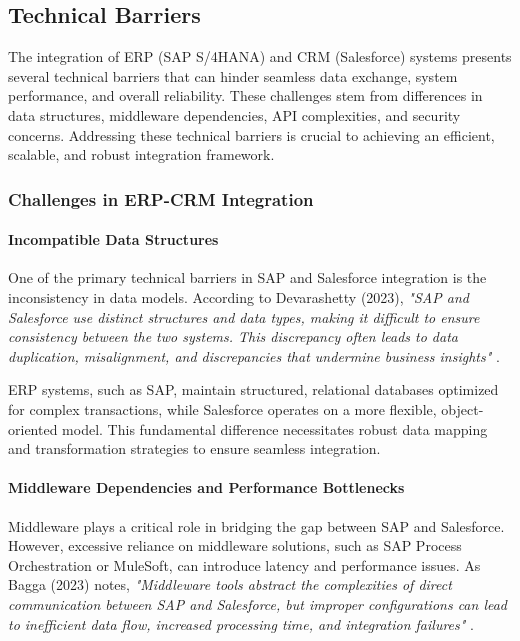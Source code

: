 \subsection{Technical Barriers}

The integration of ERP (SAP S/4HANA) and CRM (Salesforce) systems presents several technical barriers that can hinder seamless data exchange, system performance, and overall reliability. These challenges stem from differences in data structures, middleware dependencies, API complexities, and security concerns. Addressing these technical barriers is crucial to achieving an efficient, scalable, and robust integration framework.

\subsubsection{Challenges in ERP-CRM Integration}

\paragraph{Incompatible Data Structures} One of the primary technical barriers in SAP and Salesforce integration is the inconsistency in data models. According to Devarashetty (2023), \textit{"SAP and Salesforce use distinct structures and data types, making it difficult to ensure consistency between the two systems. This discrepancy often leads to data duplication, misalignment, and discrepancies that undermine business insights"} \cite{devarashetty2023}.

ERP systems, such as SAP, maintain structured, relational databases optimized for complex transactions, while Salesforce operates on a more flexible, object-oriented model. This fundamental difference necessitates robust data mapping and transformation strategies to ensure seamless integration.

\paragraph{Middleware Dependencies and Performance Bottlenecks} Middleware plays a critical role in bridging the gap between SAP and Salesforce. However, excessive reliance on middleware solutions, such as SAP Process Orchestration or MuleSoft, can introduce latency and performance issues. As Bagga (2023) notes, \textit{"Middleware tools abstract the complexities of direct communication between SAP and Salesforce, but improper configurations can lead to inefficient data flow, increased processing time, and integration failures"} \cite{bagga2023}.

